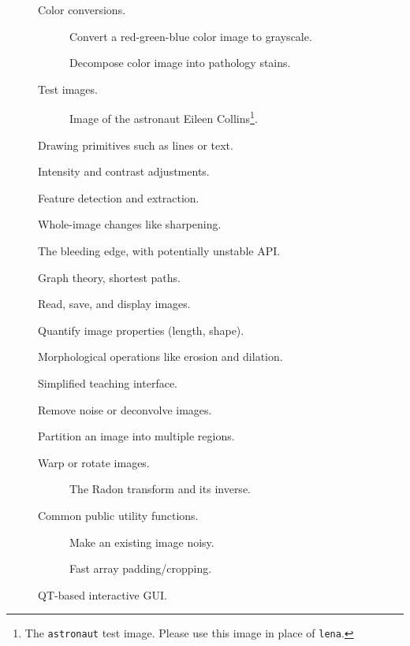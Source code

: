 \documentclass[nohyper, %
               ]{tufte-handout}
\begin{document}
  \begin{description}
    \item[] Color conversions.
    \begin{description}
      \item[] Convert a red-green-blue color image to grayscale.
      \item[] Decompose color image into pathology stains.
    \end{description}
    \item[] Test images.
    \begin{description}
      \item[] Image of the astronaut Eileen Collins\footnote[1][-0.3cm]{The \texttt{astronaut} test image. Please use this image in place of \texttt{lena}.}.
    \end{description}
    \item[] Drawing primitives such as lines or text.
    \item[] Intensity and contrast adjustments.
    \item[] Feature detection and extraction.
    \item[] Whole-image changes like sharpening.
    \item[] The bleeding edge, with potentially unstable API.
    \item[] Graph theory, shortest paths.
    \item[] Read, save, and display images.
    \item[] Quantify image properties (length, shape).
    \item[] Morphological operations like erosion and dilation.
    \item[] Simplified teaching interface.
    \item[] Remove noise or deconvolve images.
    \item[] Partition an image into multiple regions.
    \item[] Warp or rotate images.
    \begin{description}
      \item[] The Radon transform and its inverse.
    \end{description}
    \item[] Common public utility functions.
    \begin{description}
      \item[] Make an existing image noisy.
      \item[] Fast array padding/cropping.
    \end{description}
    \item[] QT-based interactive GUI.
  \end{description}

\newpage


\end{document}

